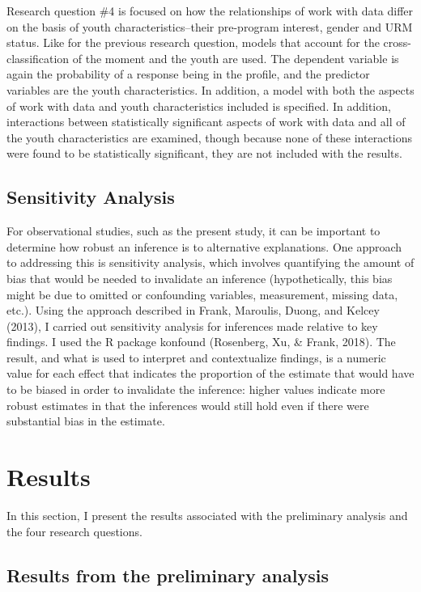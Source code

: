 \documentclass[]{msu-thesis}
\theoremstyle{definition}
\theoremstyle{definition}
\theoremstyle{definition}
\theoremstyle{remark}
\begin{document}
Research question \#4 is focused on how the relationships of work with
data differ on the basis of youth characteristics--their pre-program
interest, gender and URM status. Like for the previous research
question, models that account for the cross-classification of the moment
and the youth are used. The dependent variable is again the probability
of a response being in the profile, and the predictor variables are the
youth characteristics. In addition, a model with both the aspects of
work with data and youth characteristics included is specified. In
addition, interactions between statistically significant aspects of work
with data and all of the youth characteristics are examined, though
because none of these interactions were found to be statistically
significant, they are not included with the results.

\section{Sensitivity Analysis}\label{sensitivity-analysis}

For observational studies, such as the present study, it can be
important to determine how robust an inference is to alternative
explanations. One approach to addressing this is sensitivity analysis,
which involves quantifying the amount of bias that would be needed to
invalidate an inference (hypothetically, this bias might be due to
omitted or confounding variables, measurement, missing data, etc.).
Using the approach described in Frank, Maroulis, Duong, and Kelcey
(2013), I carried out sensitivity analysis for inferences made relative
to key findings. I used the R package konfound (Rosenberg, Xu, \& Frank,
2018). The result, and what is used to interpret and contextualize
findings, is a numeric value for each effect that indicates the
proportion of the estimate that would have to be biased in order to
invalidate the inference: higher values indicate more robust estimates
in that the inferences would still hold even if there were substantial
bias in the estimate.

\chapter{Results}\label{results}

In this section, I present the results associated with the preliminary
analysis and the four research questions.

\section{Results from the preliminary
analysis}\label{results-from-the-preliminary-analysis}
\end{document}

